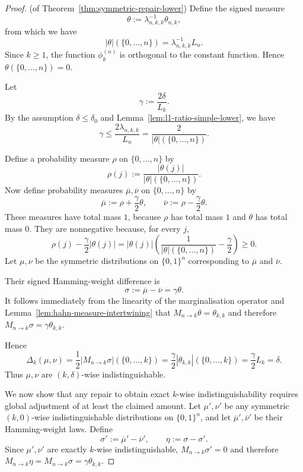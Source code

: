 \documentclass[10pt,a4paper]{amsart}
\begin{document}
\begin{proof}(of Theorem~\ref{thm:symmetric-repair-lower})
Define the signed measure
\[
    \theta:=\lambda_{n,k,k}^{-1}\theta_{n,k},
\]
from which we have
\[
    |\theta|(\{0,\dots,n\})=\lambda_{n,k,k}^{-1}L_n.
\]
Since \(k\ge 1\), the function \(\phi_k^{(n)}\) is orthogonal to the
constant function. Hence $\theta(\{0,\dots,n\})=0$.

Let
\[
    \gamma:=\frac{2\delta}{L_k}.
\]
By the assumption \(\delta\le\delta_0\) and Lemma~\ref{lem:l1-ratio-simple-lower}, we have
\[
    \gamma
    \le
    \frac{2\lambda_{n,k,k}}{L_n}
    =
    \frac{2}{|\theta|(\{0,\dots,n\})}.
\]

Define a probability measure \(\rho\) on \(\{0,\dots,n\}\) by
\[
    \rho(j):=\frac{|\theta(j)|}{|\theta|(\{0,\dots,n\})}.
\]
Now define probability measures \(\overline{\mu},\overline{\nu}\) on
\(\{0,\dots,n\}\) by
\[
    \overline{\mu}:=\rho+\frac{\gamma}{2}\theta,
    \qquad
    \overline{\nu}:=\rho-\frac{\gamma}{2}\theta.
\]
These measures have total mass \(1\), because \(\rho\) has total mass
\(1\) and \(\theta\) has total mass \(0\). They are nonnegative because,
for every \(j\),
\[
    \rho(j)-\frac{\gamma}{2}|\theta(j)|
    =
    |\theta(j)|
    \left(
        \frac{1}{|\theta|(\{0,\dots,n\})}
        -
        \frac{\gamma}{2}
    \right)
    \ge 0.
\]
Let \(\mu,\nu\) be the symmetric distributions on
\(\{0,1\}^n\) corresponding to $\overline{\mu}$ and $\overline{\nu}$.

Their signed Hamming-weight difference is
\[
    \sigma:=\overline{\mu}-\overline{\nu}
    =
    \gamma\theta.
\]
It follows immediately from the linearity of the marginalisation operator and Lemma~\ref{lem:hahn-measure-intertwining} that $M_{n\to k}\theta=\theta_{k,k}$ and therefore $M_{n\to k}\sigma=\gamma\theta_{k,k}$.

Hence
\[
    \Delta_k(\mu,\nu)=
    \frac12 |M_{n\to k}\sigma|(\{0,\dots,k\})=
    \frac{\gamma}{2}|\theta_{k,k}|(\{0,\dots,k\}) =
    \frac{\gamma}{2}L_k =
    \delta.
\]
Thus \(\mu,\nu\) are \((k,\delta)\)-wise indistinguishable.

We now show that any repair to obtain exact \(k\)-wise indistinguishability requires global adjustment of at least the claimed amount. Let \(\mu',\nu'\) be any symmetric
\((k,0)\)-wise indistinguishable distributions on \(\{0,1\}^n\), and let
\(\overline{\mu}',\overline{\nu}'\) be their Hamming-weight laws. Define
\[
    \sigma':=\overline{\mu}'-\overline{\nu}',
    \qquad
    \eta:=\sigma-\sigma'.
\]
Since \(\mu',\nu'\) are exactly \(k\)-wise indistinguishable, $M_{n\to k}\sigma'=0$ and therefore $M_{n\to k}\eta=M_{n\to k}\sigma=\gamma\theta_{k,k}$.


\end{proof}
\end{document}
